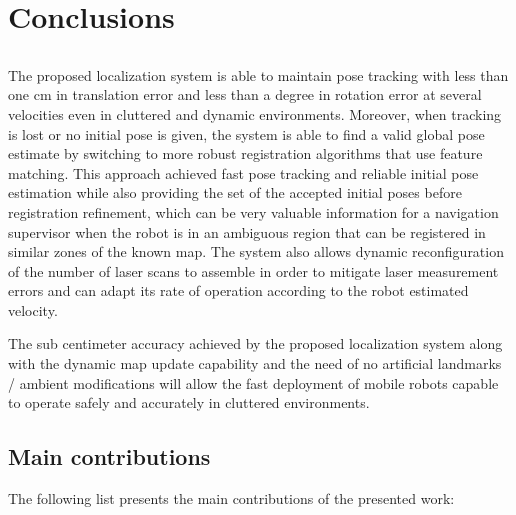 \chapter{Conclusions} \label{chap:conclusions-and-future-work}



\section*{}

The proposed localization system is able to maintain pose tracking with less than one cm in translation error and less than a degree in rotation error at several velocities even in cluttered and dynamic environments. Moreover, when tracking is lost or no initial pose is given, the system is able to find a valid global pose estimate by switching to more robust registration algorithms that use feature matching. This approach achieved fast pose tracking and reliable initial pose estimation while also providing the set of the accepted initial poses before registration refinement, which can be very valuable information for a navigation supervisor when the robot is in an ambiguous region that can be registered in similar zones of the known map. The system also allows dynamic reconfiguration of the number of laser scans to assemble in order to mitigate laser measurement errors and can adapt its rate of operation according to the robot estimated velocity.

The sub centimeter accuracy achieved by the proposed localization system along with the dynamic map update capability and the need of no artificial landmarks / ambient modifications will allow the fast deployment of mobile robots capable to operate safely and accurately in cluttered environments.



\section{Main contributions}


The following list presents the main contributions of the presented work:

